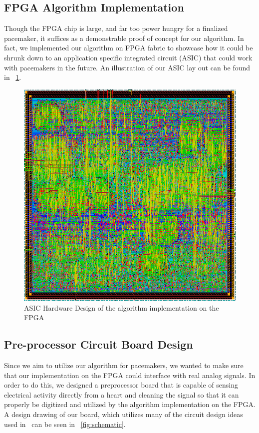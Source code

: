 \documentclass[conference]{IEEEtran}
\begin{document}
\subsection{FPGA Algorithm Implementation}
Though the FPGA chip is large, and far too power
hungry for a finalized pacemaker, it suffices as a
demonstrable proof of concept for our algorithm. In
fact, we implemented our algorithm on FPGA fabric to
showcase how it could be shrunk down to an application
specific integrated circuit (ASIC) that could work with
pacemakers in the future. An illustration of our ASIC
lay out can be found in \figurename~\ref{fig:fpga}.
\begin{figure}[h]
	\centering
	\includegraphics[width=.7\columnwidth]{fpga.png}
	\caption{ASIC Hardware Design of the algorithm implementation on the FPGA}
	\label{fig:fpga}
\end{figure}

\subsection{Pre-processor Circuit Board Design}
Since we aim to utilize our algorithm for pacemakers,
we wanted to make sure that our implementation on the
FPGA could interface with real analog signals. In order
to do this, we designed a preprocessor board that is
capable of sensing electrical activity directly from a
heart and cleaning the signal so that it can properly be
digitized and utilized by the algorithm implementation
on the FPGA. A design drawing of our board, which
utilizes many of the circuit design ideas used in~\cite{analog-adcs}
can be seen in \figurename~\ref{fig:schematic}.
\end{document}
